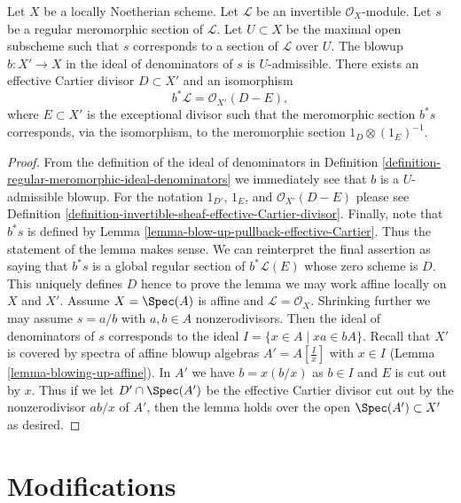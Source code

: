 \begin{lemma}
\label{lemma-blowing-up-denominators}
Let $X$ be a locally Noetherian scheme.
Let $\mathcal{L}$ be an invertible $\mathcal{O}_X$-module.
Let $s$ be a regular meromorphic section of $\mathcal{L}$.
Let $U \subset X$ be the maximal open subscheme such that
$s$ corresponds to a section of $\mathcal{L}$ over $U$.
The blowup $b : X' \to X$ in the ideal of denominators
of $s$ is $U$-admissible. There exists an effective Cartier divisor
$D \subset X'$ and an isomorphism
$$
b^*\mathcal{L} = \mathcal{O}_{X'}(D - E),
$$
where $E \subset X'$ is the exceptional divisor such that the
meromorphic section $b^*s$ corresponds, via the isomorphism,
to the meromorphic section $1_D \otimes (1_E)^{-1}$.
\end{lemma}

\begin{proof}
From the definition of the ideal of denominators in
Definition
\ref{definition-regular-meromorphic-ideal-denominators}
we immediately see that $b$ is a $U$-admissible blowup.
For the notation $1_{D'}$, $1_E$, and $\mathcal{O}_{X'}(D - E)$
please see Definition
\ref{definition-invertible-sheaf-effective-Cartier-divisor}.
Finally, note that $b^*s$ is defined by
Lemma \ref{lemma-blow-up-pullback-effective-Cartier}.
Thus the statement of the lemma makes sense.
We can reinterpret the final assertion as saying
that $b^*s$ is a global regular section of
$b^*\mathcal{L}(E)$ whose zero scheme is $D$.
This uniquely defines $D$ hence
to prove the lemma we may work affine locally on $X$ and $X'$.
Assume $X = \Spec(A)$ is affine and
$\mathcal{L} = \mathcal{O}_X$. Shrinking further we may assume
$s = a/b$ with $a, b \in A$ nonzerodivisors.
Then the ideal of denominators of $s$ corresponds
to the ideal $I = \{x \in A \mid xa \in bA\}$.
Recall that $X'$ is covered by spectra of affine blowup
algebras $A' = A[\frac{I}{x}]$ with $x \in I$
(Lemma \ref{lemma-blowing-up-affine}).
In $A'$ we have $b = x (b/x)$ as $b \in I$
and $E$ is cut out by $x$.
Thus if we let $D' \cap \Spec(A')$ be the effective
Cartier divisor cut out by the nonzerodivisor $ab/x$ of $A'$, then
the lemma holds over the open $\Spec(A') \subset X'$ as desired.
\end{proof}




\section{Modifications}
\label{section-modifications}

